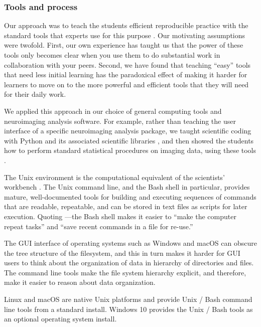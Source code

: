 \subsubsection{Tools and process}

Our approach was to teach the students efficient reproducible practice with
the standard tools that experts use for this purpose
\citep{millman2014developing}. Our motivating assumptions were twofold.
First, our own experience has taught us that the power of these tools only
becomes clear when you use them to do substantial work in collaboration with
your peers.  Second, we have found that teaching ``easy'' tools that need less
initial learning has the paradoxical effect of making it harder for learners
to move on to the more powerful and efficient tools that they will need for
their daily work.

We applied this approach in our choice of general computing tools and
neuroimaging analysis software.   For example, rather than teaching the user
interface of a specific neuroimaging analysis package, we taught scientific
coding with Python and its associated scientific libraries
\citep{millman2011python, perez2011python}, and then showed the students how to
perform standard statistical procedures on imaging data, using these tools
\citep{millman2007analysis}.

The Unix environment is the computational equivalent of the scientists'
workbench \citep{preeyanon2014reproducible}.  The Unix command line, and the
Bash shell in particular, provides mature, well-documented tools for building
and executing sequences of commands that are readable, repeatable, and can be
stored in text files as scripts for later execution.  Quoting
\cite{wilson2014best}---the Bash shell makes it easier to ``make the computer
repeat tasks'' and ``save recent commands in a file for re-use.''

The GUI interface of operating systems such as Windows and macOS can obscure
the tree structure of the filesystem, and this in turn makes it harder for GUI
users to think about the organization of data in hierarchy of directories and
files.  The command line tools make the file system hierarchy explicit, and
therefore, make it easier to reason about data organization.

Linux and macOS are native Unix platforms and provide Unix / Bash command line
tools from a standard install.  Windows 10 provides the Unix / Bash tools as
an optional operating system install.

